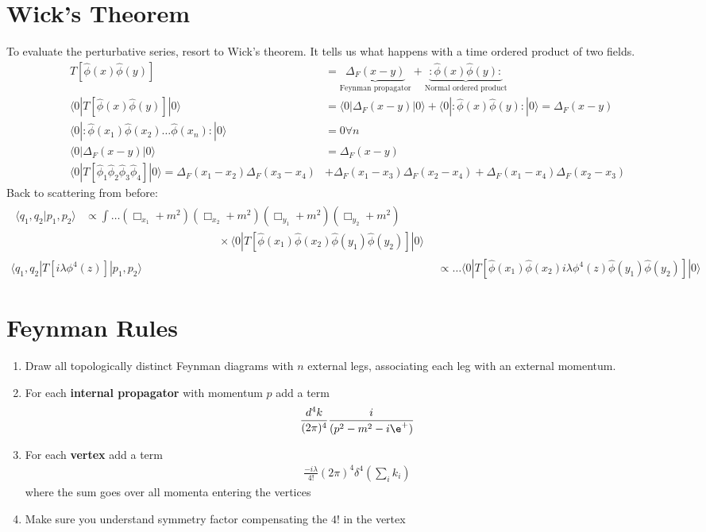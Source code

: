 \documentclass[a4paper, 11pt, normalem]{report}
\newcommand\hphi{\hat{\phi}}
\begin{document}
\section{Wick's Theorem}
To evaluate the perturbative series, resort to Wick's theorem.
It tells us what happens with a time ordered product of two fields.
\begin{align}
    T[\hphi(x)\hphi(y)] &= \underbrace{\Delta_F(x-y)}_{\text{Feynman propagator}} + \underbrace{:\hphi(x)\hphi(y):}_{\text{Normal ordered product}} \\
    \langle0|T[\hphi(x)\hphi(y)]|0\rangle &= \langle0|\Delta_F(x-y)|0\rangle + \langle0|:\hphi(x)\hphi(y):|0\rangle = \Delta_F(x-y) \\
    \langle0|:\hphi(x_1)\hphi(x_2)\dots\hphi(x_n):|0\rangle &= 0 \forall n \\
    \langle0|\Delta_F(x-y)|0\rangle &= \Delta_F(x-y) \\
    \langle0|T[\hphi_1\hphi_2\hphi_3\hphi_4]|0\rangle = \Delta_F(x_1-x_2)\Delta_F(x_3-x_4) &+ \Delta_F(x_1-x_3)\Delta_F(x_2-x_4) + \Delta_F(x_1-x_4)\Delta_F(x_2-x_3)
\end{align}
Back to scattering from before:
\begin{align}
    \begin{split} \langle q_1,q_2|p_1,p_2\rangle &\propto \int \dots (\Box_{x_1}+m^2)(\Box_{x_2}+m^2)(\Box_{y_1}+m^2)(\Box_{y_2}+m^2)\\
                                                 &\qquad\qquad\qquad\qquad\qquad\qquad\times\langle0|T[\hphi(x_1)\hphi(x_2)\hphi(y_1)\hphi(y_2)]|0\rangle\end{split} \\
    \langle q_1,q_2|T[i\lambda\phi^4(z)]|p_1,p_2\rangle &\propto \dots \langle0|T[\hphi(x_1)\hphi(x_2)i\lambda\phi^4(z)\hphi(y_1)\hphi(y_2)]|0\rangle
\end{align}

\section{Feynman Rules}
\begin{enumerate}
    \item Draw all topologically distinct Feynman diagrams with $n$ external legs, associating each leg with an external momentum.
    \item For each \textbf{internal propagator} with momentum $p$ add a term
        \begin{align}
            \frac{d^4k}{(2\pi)^4}\frac{i}{(p^2-m^2-i\e^+)}
        \end{align}
    \item For each \textbf{vertex} add a term
        \begin{align}
            \frac{-i\lambda}{4!}(2\pi)^4\delta^4\left(\sum_i k_i\right)
        \end{align}
        where the sum goes over all momenta entering the vertices
    \item Make sure you understand symmetry factor compensating the $4!$ in the vertex
\end{enumerate}
\end{document}
